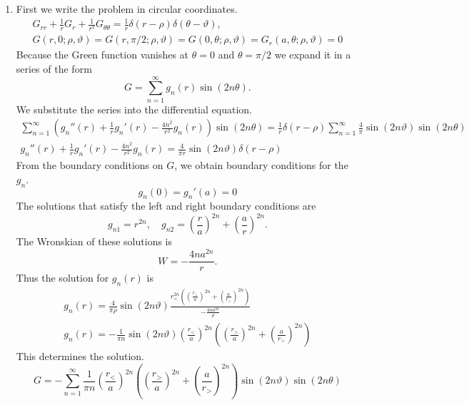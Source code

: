 {\begin{Solution}
\begin{enumerate}
\[    \left( \frac{r_<}{a} \right)^n \left( \left( \frac{r_>}{a} \right)^n 
      - \left( \frac{a}{r_>} \right)^n \right)
    \sin(n \vartheta) \sin (n \theta)
    \]
  \item
    First we write the problem in circular coordinates.
    \begin{gather*}
      G_{r r} + \frac{1}{r} G_r + \frac{1}{r^2} G_{\theta \theta}
      = \frac{1}{r} \delta(r - \rho) \delta(\theta - \vartheta), \\
      G(r,0; \rho, \vartheta) = G(r,\pi/2; \rho, \vartheta) = 
      G(0,\theta; \rho, \vartheta) = G_r(a,\theta; \rho, \vartheta) = 0
    \end{gather*}
    Because the Green function vanishes at $\theta = 0$ and
    $\theta = \pi/2$ we expand it in a series of the form
    \[
    G = \sum_{n = 1}^\infty g_n(r) \sin (2 n \theta).
    \]
    We substitute the series into the differential equation.
    \begin{gather*}
      \sum_{n = 1}^\infty \left( g_n''(r) + \frac{1}{r} g_n'(r) 
        - \frac{4 n^2}{r^2} g_n(r) \right) \sin (2 n \theta)
      = \frac{1}{r} \delta(r - \rho) 
      \sum_{n = 1}^\infty \frac{4}{\pi} \sin(2 n \vartheta) \sin(2 n \theta) \\
      g_n''(r) + \frac{1}{r} g_n'(r) - \frac{4 n^2}{r^2} g_n(r) 
      = \frac{4}{\pi r} \sin(2 n \vartheta) \delta(r - \rho) 
    \end{gather*}
    From the boundary conditions on $G$, we obtain boundary conditions 
    for the $g_n$.
    \[
    g_n(0) = g_n'(a) = 0
    \]
    The solutions that satisfy the left and right boundary conditions are
    \[
    g_{n1} = r^{2 n}, \quad
    g_{n2} = \left( \frac{r}{a} \right)^{2 n} 
    +  \left( \frac{a}{r} \right)^{2 n}.
    \]
    The Wronskian of these solutions is
    \[
    W = - \frac{4 n a^{2 n}}{r}.
    \]
    Thus the solution for $g_n(r)$ is
    \begin{gather*}
      g_n(r) = \frac{4}{\pi \rho} \sin(2 n \vartheta) 
      \frac{ r_<^{2 n} \left( \left( \frac{r_>}{a} \right)^{2 n} 
          +  \left( \frac{a}{r_>} \right)^{2 n} \right) }
      { - \frac{4 n a^{2 n}}{\rho} } \\
      g_n(r) = - \frac{ 1 }{\pi n} \sin(2 n \vartheta) 
      \left( \frac{r_<}{a} \right)^{2 n} 
      \left( \left( \frac{r_>}{a} \right)^{2 n} 
        +  \left( \frac{a}{r_>} \right)^{2 n} \right)
    \end{gather*}
    This determines the solution.
    \[
    G = - \sum_{n = 1}^\infty \frac{ 1 }{ \pi n } 
    \left( \frac{r_<}{a} \right)^{2 n}
    \left( \left( \frac{r_>}{a} \right)^{2 n} 
      +  \left( \frac{a}{r_>} \right)^{2 n} \right)
    \sin(2 n \vartheta) \sin (2 n \theta)
    \]
  \end{enumerate}
\end{Solution}










}
